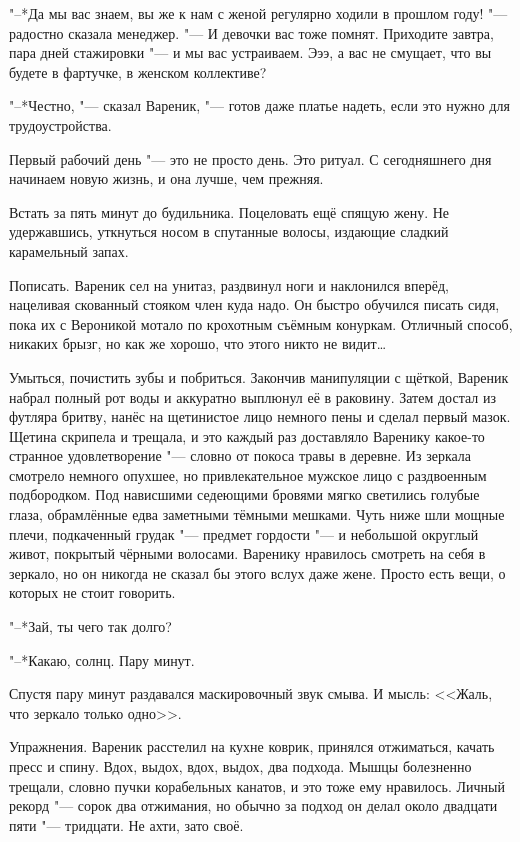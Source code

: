 "--*Да мы вас знаем, вы же к нам с женой регулярно ходили в прошлом году! "--- радостно сказала менеджер.
"--- И девочки вас тоже помнят.
Приходите завтра, пара дней стажировки "--- и мы вас устраиваем.
Эээ, а вас не смущает, что вы будете в фартучке, в женском коллективе?

"--*Честно, "--- сказал Вареник, "--- готов даже платье надеть, если это нужно для трудоустройства.

\asterism

\label{Wed_2012_04_25}

Первый рабочий день "--- это не просто день.
Это ритуал.
С сегодняшнего дня начинаем новую жизнь, и она лучше, чем прежняя.

Встать за пять минут до будильника.
Поцеловать ещё спящую жену.
Не удержавшись, уткнуться носом в спутанные волосы, издающие сладкий карамельный запах.

Пописать.
Вареник сел на унитаз, раздвинул ноги и наклонился вперёд, нацеливая скованный стояком член куда надо.
Он быстро обучился писать сидя, пока их с Вероникой мотало по крохотным съёмным конуркам.
Отличный способ, никаких брызг, но как же хорошо, что этого никто не видит\dots{}

Умыться, почистить зубы и побриться.
Закончив манипуляции с щёткой, Вареник набрал полный рот воды и аккуратно выплюнул её в раковину.
Затем достал из футляра бритву, нанёс на щетинистое лицо немного пены и сделал первый мазок.
Щетина скрипела и трещала, и это каждый раз доставляло Варенику какое-то странное удовлетворение "--- словно от покоса травы в деревне.
Из зеркала смотрело немного опухшее, но привлекательное мужское лицо с раздвоенным подбородком.
Под нависшими седеющими бровями мягко светились голубые глаза, обрамлённые едва заметными тёмными мешками.
Чуть ниже шли мощные плечи, подкаченный грудак "--- предмет гордости "--- и небольшой округлый живот, покрытый чёрными волосами.
Варенику нравилось смотреть на себя в зеркало, но он никогда не сказал бы этого вслух даже жене.
Просто есть вещи, о которых не стоит говорить.

"--*Зай, ты чего так долго?

"--*Какаю, солнц.
Пару минут.

Спустя пару минут раздавался маскировочный звук смыва.
И мысль:
<<Жаль, что зеркало только одно>>.

Упражнения.
Вареник расстелил на кухне коврик, принялся отжиматься, качать пресс и спину.
Вдох, выдох, вдох, выдох, два подхода.
Мышцы болезненно трещали, словно пучки корабельных канатов, и это тоже ему нравилось.
Личный рекорд "--- сорок два отжимания, но обычно за подход он делал около двадцати пяти "--- тридцати.
Не ахти, зато своё.

